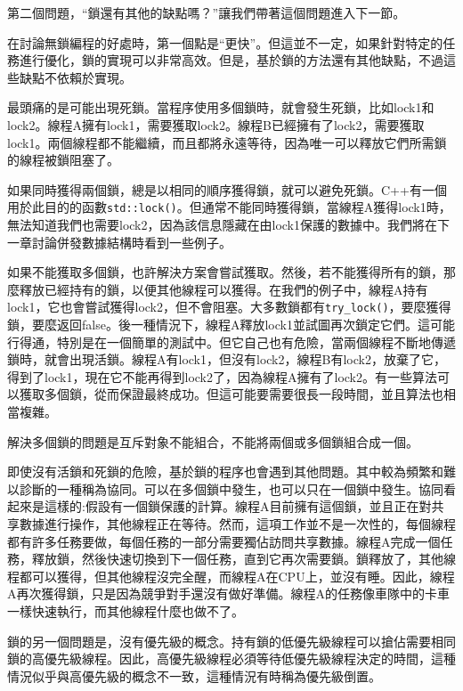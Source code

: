 第二個問題，“鎖還有其他的缺點嗎？”讓我們帶著這個問題進入下一節。


在討論無鎖編程的好處時，第一個點是“更快”。但這並不一定，如果針對特定的任務進行優化，鎖的實現可以非常高效。但是，基於鎖的方法還有其他缺點，不過這些缺點不依賴於實現。

最頭痛的是可能出現死鎖。當程序使用多個鎖時，就會發生死鎖，比如lock1和lock2。線程A擁有lock1，需要獲取lock2。線程B已經擁有了lock2，需要獲取lock1。兩個線程都不能繼續，而且都將永遠等待，因為唯一可以釋放它們所需鎖的線程被鎖阻塞了。

如果同時獲得兩個鎖，總是以相同的順序獲得鎖，就可以避免死鎖。C++有一個用於此目的的函數\texttt{std::lock()}。但通常不能同時獲得鎖，當線程A獲得lock1時，無法知道我們也需要lock2，因為該信息隱藏在由lock1保護的數據中。我們將在下一章討論併發數據結構時看到一些例子。

如果不能獲取多個鎖，也許解決方案會嘗試獲取。然後，若不能獲得所有的鎖，那麼釋放已經持有的鎖，以便其他線程可以獲得。在我們的例子中，線程A持有lock1，它也會嘗試獲得lock2，但不會阻塞。大多數鎖都有\texttt{try\_lock()}，要麼獲得鎖，要麼返回false。後一種情況下，線程A釋放lock1並試圖再次鎖定它們。這可能行得通，特別是在一個簡單的測試中。但它自己也有危險，當兩個線程不斷地傳遞鎖時，就會出現活鎖。線程A有lock1，但沒有lock2，線程B有lock2，放棄了它，得到了lock1，現在它不能再得到lock2了，因為線程A擁有了lock2。有一些算法可以獲取多個鎖，從而保證最終成功。但這可能要需要很長一段時間，並且算法也相當複雜。

解決多個鎖的問題是互斥對象不能組合，不能將兩個或多個鎖組合成一個。

即使沒有活鎖和死鎖的危險，基於鎖的程序也會遇到其他問題。其中較為頻繁和難以診斷的一種稱為協同。可以在多個鎖中發生，也可以只在一個鎖中發生。協同看起來是這樣的:假設有一個鎖保護的計算。線程A目前擁有這個鎖，並且正在對共享數據進行操作，其他線程正在等待。然而，這項工作並不是一次性的，每個線程都有許多任務要做，每個任務的一部分需要獨佔訪問共享數據。線程A完成一個任務，釋放鎖，然後快速切換到下一個任務，直到它再次需要鎖。鎖釋放了，其他線程都可以獲得，但其他線程沒完全醒，而線程A在CPU上，並沒有睡。因此，線程A再次獲得鎖，只是因為競爭對手還沒有做好準備。線程A的任務像車隊中的卡車一樣快速執行，而其他線程什麼也做不了。

鎖的另一個問題是，沒有優先級的概念。持有鎖的低優先級線程可以搶佔需要相同鎖的高優先級線程。因此，高優先級線程必須等待低優先級線程決定的時間，這種情況似乎與高優先級的概念不一致，這種情況有時稱為優先級倒置。

